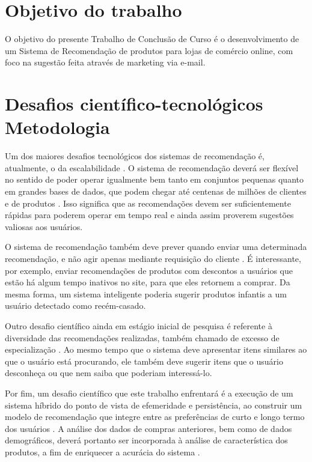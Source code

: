 \section{Objetivo do trabalho} %
\label{sec:objetivo_do_trabalho}

O objetivo do presente Trabalho de Conclusão de Curso é o desenvolvimento de um Sistema de Recomendação de produtos para lojas de comércio online, com foco na sugestão feita através de marketing via e-mail.

\section{Desafios científico-tecnológicos \\ Metodologia} %
\label{sec:desafios_cient_fico_tecnol_gicos_metodologia}

Um dos maiores desafios tecnológicos dos sistemas de recomendação é, atualmente, o da escalabilidade \cite{wei2007survey}. O sistema de recomendação deverá ser flexível no sentido de poder operar igualmente bem tanto em conjuntos pequenas quanto em grandes bases de dados, que podem chegar até centenas de milhões de clientes \cite{amazoncustomers} e de produtos \cite{amazonproducts}. Isso significa que as recomendações devem ser suficientemente rápidas para poderem operar em tempo real e ainda assim proverem sugestões valiosas aos usuários.

O sistema de recomendação também deve prever quando enviar uma determinada recomendação, e não agir apenas mediante requisição do cliente \cite{lops2011content}. É interessante, por exemplo, enviar recomendações de produtos com descontos a usuários que estão há algum tempo inativos no site, para que eles retornem a comprar. Da mesma forma, um sistema inteligente poderia sugerir produtos infantis a um usuário detectado como recém-casado.

Outro desafio científico ainda em estágio inicial de pesquisa é referente à diversidade das recomendações realizadas, também chamado de excesso de especialização \cite{adomavicius2005toward}. Ao mesmo tempo que o sistema deve apresentar itens similares ao que o usuário está procurando, ele também deve sugerir itens que o usuário desconheça ou que nem saiba que poderiam interessá-lo. 

Por fim, um desafio científico que este trabalho enfrentará é a execução de um sistema híbrido do ponto de vista de efemeridade e persistência, ao construir um modelo de recomendação que integre entre as preferências de curto e longo termo dos usuários \cite{schafer1999recommender}. A análise dos dados de compras anteriores, bem como de dados demográficos, deverá portanto ser incorporada à análise de característica dos produtos, a fim de enriquecer a acurácia do sistema \cite{wei2007survey}.

